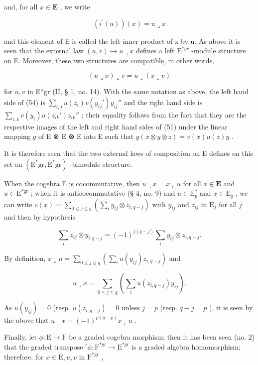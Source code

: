 and, for all \(x \in \mathbf{E}\) , we write

\[
\left(i ^ {\prime} (u)\right) (x) = u \lrcorner x\tag{53}
\]

and this element of E is called the left inner product of x by u. As above it is seen that the external law \((u, v) \mapsto u \lrcorner x\) defines a left \(\mathrm{E}^{*gr}\) -module structure on E. Moreover, these two structures are compatible, in other words,

\[
(u \lrcorner x) \llcorner v = u \lrcorner (x \llcorner v)\tag{54}
\]

for \(u, v\) in E*gr (II, § 1, no. 14). With the same notation as above, the left hand side of (54) is \(\sum_{i,j} u(z_i) v(y_{ij}') y_{ij}''\) and the right hand side is \(\sum_{i,k} v(y_i) u(z_{ik}') z_{ik}''\) ; their equality follows from the fact that they are the respective images of the left and right hand sides of (51) under the linear mapping \(g\) of E ⊗ E ⊗ E into E such that \(g(x \otimes y \otimes z) = v(x) u(z)y\) .

It is therefore seen that the two external laws of composition on E defines on this set an \((\mathrm{E}^{*}\mathrm{gr}, \mathrm{E}^{*}\mathrm{gr})\) -bimodule structure.

When the cogebra E is cocommutative, then \(u \lrcorner x = x \llcorner u\) for all \(x \in \mathbf{E}\) and \(u \in \mathrm{E}^{*\mathrm{gr}}\) ; when it is anticocommutative (§ 4, no. 9) and \(u \in \mathrm{E}_p^*\) and \(x \in \mathrm{E}_q\) , we can write \(c(x) = \sum_{0 \leqslant j \leqslant q} \left( \sum_i y_{ij} \otimes z_{i,q-j} \right)\) with \(y_{ij}\) and \(z_{ij}\) in \(\mathrm{E}_j\) for all \(j\) and then by hypothesis

\[
\sum_ {i} z _ {i j} \otimes y _ {i, q - j} = (- 1) ^ {j (q - j)} \sum_ {i} y _ {i j} \otimes z _ {i, q - j}.
\]

By definition, \(x \llcorner u = \sum_{0 \leqslant j \leqslant q} \left( \sum_{i} u(y_{ij}) z_{i,q-j} \right)\) and

\[
u \lrcorner x = \sum_ {0 \leqslant j \leqslant q} \left(\sum_ {i} u (z _ {i, q - j}) y _ {i j}\right).
\]

As \(u(y_{ij}) = 0\) (resp. \(u(z_{i,q-j}) = 0\) unless \(j = p\) (resp. \(q - j = p\) ), it is seen by the above that \(u \lrcorner x = (-1)^{p(q-p)}x \llcorner u\) .

Finally, let \(\phi: \mathrm{E} \to \mathrm{F}\) be a graded cogebra morphism; then it has been seen (no. 2) that the graded transpose \(^t\phi: \mathrm{F}^{*\mathrm{gr}} \to \mathrm{E}^{*\mathrm{gr}}\) is a graded algebra homomorphism; therefore, for \(x \in \mathrm{E}, u, v\) in \(\mathrm{F}^{*\mathrm{gr}}\) ,

